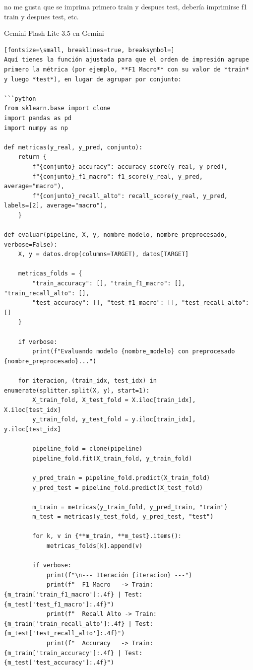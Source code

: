 \documentclass[12pt,a4paper,oneside]{book}
\begin{document}
\begin{iaprompt}
no me gusta que se imprima primero train y despues test, debería imprimirse f1 train y despues test, etc.
\end{iaprompt}
\begin{iaresp}{Gemini Flash Lite 3.5 en Gemini}
\begin{Verbatim}[fontsize=\small, breaklines=true, breaksymbol=]
Aquí tienes la función ajustada para que el orden de impresión agrupe primero la métrica (por ejemplo, **F1 Macro** con su valor de *train* y luego *test*), en lugar de agrupar por conjunto:

```python
from sklearn.base import clone
import pandas as pd
import numpy as np

def metricas(y_real, y_pred, conjunto):
    return {
        f"{conjunto}_accuracy": accuracy_score(y_real, y_pred),
        f"{conjunto}_f1_macro": f1_score(y_real, y_pred, average="macro"),
        f"{conjunto}_recall_alto": recall_score(y_real, y_pred, labels=[2], average="macro"),
    }

def evaluar(pipeline, X, y, nombre_modelo, nombre_preprocesado, verbose=False):
    X, y = datos.drop(columns=TARGET), datos[TARGET]
    
    metricas_folds = {
        "train_accuracy": [], "train_f1_macro": [], "train_recall_alto": [],
        "test_accuracy": [], "test_f1_macro": [], "test_recall_alto": []
    }
    
    if verbose:
        print(f"Evaluando modelo {nombre_modelo} con preprocesado {nombre_preprocesado}...")
        
    for iteracion, (train_idx, test_idx) in enumerate(splitter.split(X, y), start=1):
        X_train_fold, X_test_fold = X.iloc[train_idx], X.iloc[test_idx]
        y_train_fold, y_test_fold = y.iloc[train_idx], y.iloc[test_idx]
        
        pipeline_fold = clone(pipeline)
        pipeline_fold.fit(X_train_fold, y_train_fold)
        
        y_pred_train = pipeline_fold.predict(X_train_fold)
        y_pred_test = pipeline_fold.predict(X_test_fold)
        
        m_train = metricas(y_train_fold, y_pred_train, "train")
        m_test = metricas(y_test_fold, y_pred_test, "test")
        
        for k, v in {**m_train, **m_test}.items():
            metricas_folds[k].append(v)
            
        if verbose:
            print(f"\n--- Iteración {iteracion} ---")
            print(f"  F1 Macro   -> Train: {m_train['train_f1_macro']:.4f} | Test: {m_test['test_f1_macro']:.4f}")
            print(f"  Recall Alto -> Train: {m_train['train_recall_alto']:.4f} | Test: {m_test['test_recall_alto']:.4f}")
            print(f"  Accuracy   -> Train: {m_train['train_accuracy']:.4f} | Test: {m_test['test_accuracy']:.4f}")
            

\end{Verbatim}
\end{iaresp}
\end{document}
